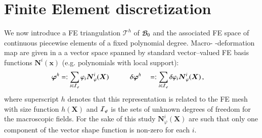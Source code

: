\documentclass[preprint,12pt,times]{elsarticle}
\def\gz  #1{           \mbox{$\boldsymbol{#1}$}}
\def\mcl  #1{               {\cal #1}}
\begin{document}
\section{Finite Element discretization}

We now introduce a FE triangulation $\mathcal{T}^h$ of $\mcl B_0$ and
the associated FE space of continuous piecewise elements of a fixed polynomial degree. %
Macro- -deformation map are given in a
a vector space spanned by standard vector--valued FE basis functions $\gz N^i(\gz x)$ (e.g. polynomials with local support):
\begin{alignat}{2}
       \gz \varphi^h &=:  \sum_{i \in \mcl I_\varphi}       \varphi_i \gz N^i_\varphi (\gz X) \quad \quad \quad
\delta \gz \varphi^h &&=: \sum_{i \in \mcl I_\varphi} \delta \varphi_i \gz N^i_\varphi (\gz X) \,,
\end{alignat}
where superscript $h$ denotes that this representation is related to the FE mesh with size function $h(\gz X)$ and $\mcl I_\varphi$ is the sets of unknown degrees of freedom for the
macroscopic fields. For the sake of this study $\gz N^i_\varphi (\gz X)$ are such that only one component of the vector shape function is non-zero for each $i$.
\end{document}
